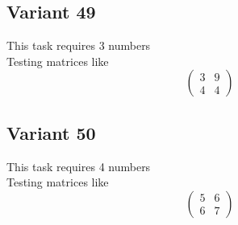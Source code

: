 \documentclass[11pt]{article}
\begin{document}
\subsection*{Variant 49}
This task requires 3 numbers\\
Testing matrices like \[ \begin{pmatrix} 3 & 9\\ 4 & 4 \end{pmatrix} \]

\subsection*{Variant 50}
This task requires 4 numbers\\
Testing matrices like \[ \begin{pmatrix} 5 & 6\\ 6 & 7 \end{pmatrix} \]
\end{document}
